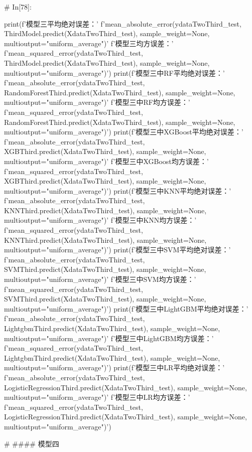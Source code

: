 \documentclass{MathorCupmodeling}
\begin{document}
\begin{python}
# In[78]:


print(f'模型三平均绝对误差：'
      f'{mean_absolute_error(ydataTwoThird_test, ThirdModel.predict(XdataTwoThird_test), sample_weight=None, multioutput="uniform_average")}\n'
      f'模型三均方误差：'
      f'{mean_squared_error(ydataTwoThird_test, ThirdModel.predict(XdataTwoThird_test), sample_weight=None, multioutput="uniform_average")}')
print(f'模型三中RF平均绝对误差：'
      f'{mean_absolute_error(ydataTwoThird_test, RandomForestThird.predict(XdataTwoThird_test), sample_weight=None, multioutput="uniform_average")}\n'
      f'模型三中RF均方误差：'
      f'{mean_squared_error(ydataTwoThird_test, RandomForestThird.predict(XdataTwoThird_test), sample_weight=None, multioutput="uniform_average")}')
print(f'模型三中XGBoost平均绝对误差：'
      f'{mean_absolute_error(ydataTwoThird_test, XGBThird.predict(XdataTwoThird_test), sample_weight=None, multioutput="uniform_average")}\n'
      f'模型三中XGBoost均方误差：'
      f'{mean_squared_error(ydataTwoThird_test, XGBThird.predict(XdataTwoThird_test), sample_weight=None, multioutput="uniform_average")}')
print(f'模型三中KNN平均绝对误差：'
      f'{mean_absolute_error(ydataTwoThird_test, KNNThird.predict(XdataTwoThird_test), sample_weight=None, multioutput="uniform_average")}\n'
      f'模型三中KNN均方误差：'
      f'{mean_squared_error(ydataTwoThird_test, KNNThird.predict(XdataTwoThird_test), sample_weight=None, multioutput="uniform_average")}')
print(f'模型三中SVM平均绝对误差：'
      f'{mean_absolute_error(ydataTwoThird_test, SVMThird.predict(XdataTwoThird_test), sample_weight=None, multioutput="uniform_average")}\n'
      f'模型三中SVM均方误差：'
      f'{mean_squared_error(ydataTwoThird_test, SVMThird.predict(XdataTwoThird_test), sample_weight=None, multioutput="uniform_average")}')
print(f'模型三中LightGBM平均绝对误差：'
      f'{mean_absolute_error(ydataTwoThird_test, LightgbmThird.predict(XdataTwoThird_test), sample_weight=None, multioutput="uniform_average")}\n'
      f'模型三中LightGBM均方误差：'
      f'{mean_squared_error(ydataTwoThird_test, LightgbmThird.predict(XdataTwoThird_test), sample_weight=None, multioutput="uniform_average")}')
print(f'模型三中LR平均绝对误差：'
      f'{mean_absolute_error(ydataTwoThird_test, LogisticRegressionThird.predict(XdataTwoThird_test), sample_weight=None, multioutput="uniform_average")}\n'
      f'模型三中LR均方误差：'
      f'{mean_squared_error(ydataTwoThird_test, LogisticRegressionThird.predict(XdataTwoThird_test), sample_weight=None, multioutput="uniform_average")}')


# #### 模型四


\end{python}
\end{document}

